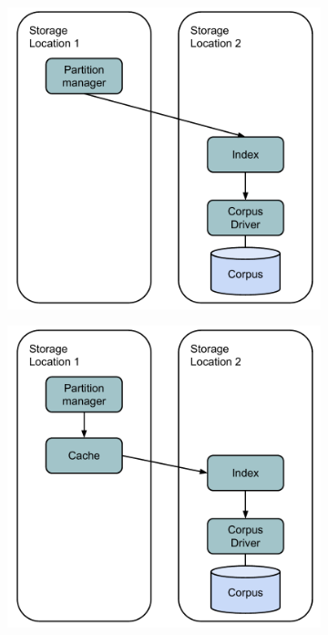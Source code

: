 \begin{figure}[H]
\begin{subfigure}{0.24\textwidth}
    \caption{}
    \label{fig:ycsb_freshness_remote_corpus}
  \end{subfigure}%
  \hspace*{\fill}
  \begin{subfigure}{0.24\textwidth}
    \includegraphics[width=\linewidth]{./figures/evaluation/ycsb_freshness_remote_client.pdf}
    \caption{}
    \label{fig:ycsb_freshness_remote_client}
  \end{subfigure}%
  \hspace*{\fill}
  \begin{subfigure}{0.24\textwidth}
    \includegraphics[width=\linewidth]{./figures/evaluation/ycsb_freshness_remote_client_cache.pdf}

\end{subfigure}
\end{figure}
